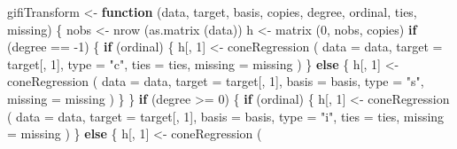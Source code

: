 \documentclass[
  12pt,
]{book}
\newenvironment{Shaded}{\begin{snugshade}}{\end{snugshade}}
\newcommand{\AttributeTok}[1]{\textcolor[rgb]{0.77,0.63,0.00}{#1}}
\newcommand{\ControlFlowTok}[1]{\textcolor[rgb]{0.13,0.29,0.53}{\textbf{#1}}}
\newcommand{\DecValTok}[1]{\textcolor[rgb]{0.00,0.00,0.81}{#1}}
\newcommand{\FunctionTok}[1]{\textcolor[rgb]{0.00,0.00,0.00}{#1}}
\newcommand{\NormalTok}[1]{#1}
\newcommand{\OtherTok}[1]{\textcolor[rgb]{0.56,0.35,0.01}{#1}}
\newcommand{\SpecialCharTok}[1]{\textcolor[rgb]{0.00,0.00,0.00}{#1}}
\newcommand{\StringTok}[1]{\textcolor[rgb]{0.31,0.60,0.02}{#1}}
\begin{document}
\begin{Shaded}
\begin{Highlighting}[]
\NormalTok{gifiTransform }\OtherTok{\textless{}{-}}
  \ControlFlowTok{function}\NormalTok{ (data,}
\NormalTok{            target,}
\NormalTok{            basis,}
\NormalTok{            copies,}
\NormalTok{            degree,}
\NormalTok{            ordinal,}
\NormalTok{            ties,}
\NormalTok{            missing) \{}
\NormalTok{    nobs }\OtherTok{\textless{}{-}} \FunctionTok{nrow}\NormalTok{ (}\FunctionTok{as.matrix}\NormalTok{ (data))}
\NormalTok{    h }\OtherTok{\textless{}{-}} \FunctionTok{matrix}\NormalTok{ (}\DecValTok{0}\NormalTok{, nobs, copies)}
    \ControlFlowTok{if}\NormalTok{ (degree }\SpecialCharTok{==} \SpecialCharTok{{-}}\DecValTok{1}\NormalTok{) \{}
      \ControlFlowTok{if}\NormalTok{ (ordinal) \{}
\NormalTok{        h[, }\DecValTok{1}\NormalTok{] }\OtherTok{\textless{}{-}}
          \FunctionTok{coneRegression}\NormalTok{ (}
            \AttributeTok{data =}\NormalTok{ data,}
            \AttributeTok{target =}\NormalTok{ target[, }\DecValTok{1}\NormalTok{],}
            \AttributeTok{type =} \StringTok{"c"}\NormalTok{,}
            \AttributeTok{ties =}\NormalTok{ ties,}
            \AttributeTok{missing =}\NormalTok{ missing}
\NormalTok{          )}
\NormalTok{      \}}
      \ControlFlowTok{else}\NormalTok{ \{}
\NormalTok{        h[, }\DecValTok{1}\NormalTok{] }\OtherTok{\textless{}{-}}
          \FunctionTok{coneRegression}\NormalTok{ (}
            \AttributeTok{data =}\NormalTok{ data,}
            \AttributeTok{target =}\NormalTok{ target[, }\DecValTok{1}\NormalTok{],}
            \AttributeTok{basis =}\NormalTok{ basis,}
            \AttributeTok{type =} \StringTok{"s"}\NormalTok{,}
            \AttributeTok{missing =}\NormalTok{ missing}
\NormalTok{          )}
\NormalTok{      \}}
\NormalTok{    \}}
    \ControlFlowTok{if}\NormalTok{ (degree }\SpecialCharTok{\textgreater{}=} \DecValTok{0}\NormalTok{) \{}
      \ControlFlowTok{if}\NormalTok{ (ordinal) \{}
\NormalTok{        h[, }\DecValTok{1}\NormalTok{] }\OtherTok{\textless{}{-}}
          \FunctionTok{coneRegression}\NormalTok{ (}
            \AttributeTok{data =}\NormalTok{ data,}
            \AttributeTok{target =}\NormalTok{ target[, }\DecValTok{1}\NormalTok{],}
            \AttributeTok{basis =}\NormalTok{ basis,}
            \AttributeTok{type =} \StringTok{"i"}\NormalTok{,}
            \AttributeTok{ties =}\NormalTok{ ties,}
            \AttributeTok{missing =}\NormalTok{ missing}
\NormalTok{          )}
\NormalTok{      \}}
      \ControlFlowTok{else}\NormalTok{ \{}
\NormalTok{        h[, }\DecValTok{1}\NormalTok{] }\OtherTok{\textless{}{-}}
          \FunctionTok{coneRegression}\NormalTok{ (}

\end{Highlighting}
\end{Shaded}
\end{document}
